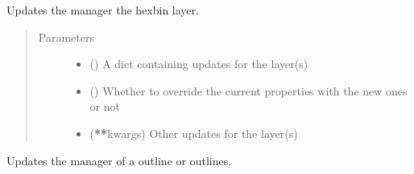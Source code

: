 \documentclass[letterpaper,10pt,english]{sphinxmanual}
\begin{document}
\begin{fulllineitems}
\begin{fulllineitems}
\label{\detokenize{builder:geohexviz.builder.PlotBuilder.update_hexbin_manager}}
\sphinxAtStartPar
Updates the manager the hexbin layer.
\begin{quote}\begin{description}
\item[{Parameters}] \leavevmode\begin{itemize}
\item {} 
\sphinxAtStartPar
{} () \textendash{} A dict containing updates for the layer(s)

\item {} 
\sphinxAtStartPar
{} () \textendash{} Whether to override the current properties with the new ones or not

\item {} 
\sphinxAtStartPar
{} ({\color{red}\bfseries{}**}kwargs) \textendash{} Other updates for the layer(s)

\end{itemize}

\end{description}\end{quote}

\end{fulllineitems}


\begin{fulllineitems}
\label{\detokenize{builder:geohexviz.builder.PlotBuilder.update_outline_manager}}
\sphinxAtStartPar
Updates the manager of a outline or outlines.


\end{fulllineitems}
\end{fulllineitems}
\end{document}

